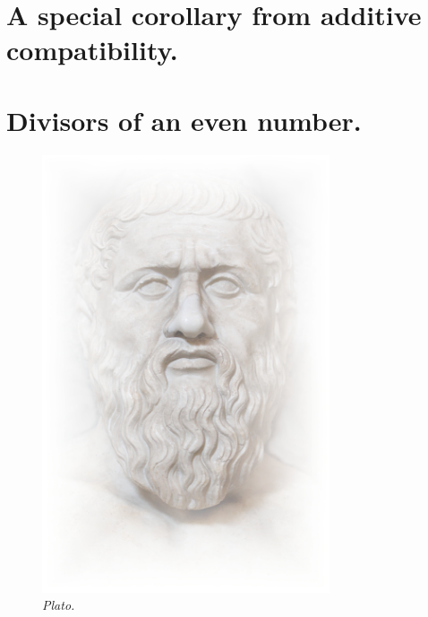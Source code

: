 \documentclass[preview]{standalone}
\begin{document}
\section{A special corollary from additive compatibility.}

\pagebreak


\section{Divisors of an even number.}

\begin{figure}[h!]
    \centering
    \includegraphics[width=8.5cm]{../resources/jpg/1.6.introduction.to.proofs/plato.jpg}
    \caption*{\emph{Plato.}}
\end{figure}
\pagebreak


\end{document}
